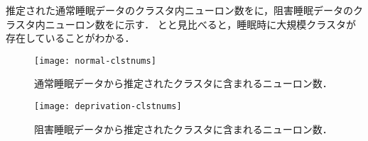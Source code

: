 
推定された通常睡眠データのクラスタ内ニューロン数をに，阻害睡眠データのクラスタ内ニューロン数をに示す．
とと見比べると，睡眠時に大規模クラスタが存在していることがわかる．

\begin{figure}[htbp]
	\begin{minipage}{0.5\hsize}
		\begin{center}
			\texttt{[image: normal-clstnums]}
			\caption{通常睡眠データから推定されたクラスタに含まれるニューロン数．}
			\label{fig:normal-clstnums}
		\end{center}
	\end{minipage}
	\begin{minipage}{0.5\hsize}
		\begin{center}
				\texttt{[image: deprivation-clstnums]}
				\caption{阻害睡眠データから推定されたクラスタに含まれるニューロン数．}
				\label{fig:deprivation-clstnums}
		\end{center}
	\end{minipage}
\end{figure}

